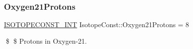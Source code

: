 \subsubsection{\texorpdfstring{Oxygen21\+Protons}{Oxygen21Protons}}
{\footnotesize\ttfamily \mbox{\hyperlink{group___isotope_const-_macros_ga5f18360b3e99483a35c32d789e62621c}{I\+S\+O\+T\+O\+P\+E\+C\+O\+N\+S\+T\+\_\+\+I\+NT}} Isotope\+Const\+::\+Oxygen21\+Protons = 8}

\$ \$ Protons in Oxygen-\/21. 